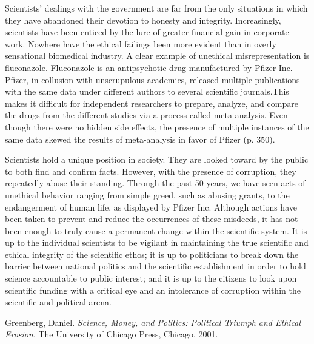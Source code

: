 \documentclass{article}[12pt]
\begin{document}
Scientists' dealings with the government are far from the only situations in
which they have abandoned their devotion to honesty and integrity.
Increasingly, scientists have been enticed by the lure of greater financial
gain in corporate work. Nowhere have the ethical failings been more evident
than in overly sensational biomedical industry. A clear example of unethical
misrepresentation is fluconazole.  Fluconazole is an antipsychotic drug
manufactured by Pfizer Inc.  Pfizer, in collusion with unscrupulous academics,
released multiple publications with the same data under different authors to
several scientific journals.This makes it difficult for independent researchers
to prepare, analyze, and compare the drugs from  the different studies via a
process called meta-analysis. Even though there were no hidden side effects,
the presence of multiple instances of the same data skewed the results of
meta-analysis in favor of Pfizer (p. 350).

Scientists hold a unique position in society. They are looked toward by the
public to both find and confirm facts. However, with the presence of
corruption, they repeatedly abuse their standing.  Through the past 50 years,
we have seen acts of unethical behavior ranging from simple greed, such as
abusing grants, to the endangerment of human life, as displayed by Pfizer Inc.
Although actions have been taken to prevent and reduce the occurrences of these
misdeeds, it has not been enough to truly cause a permanent change within the
scientific system. It is up to the individual scientists to be vigilant in
maintaining the true scientific and ethical integrity of the scientific ethos;
it is up to politicians to break down the barrier between national politics and
the scientific establishment in order to hold science accountable to public
interest; and it is up to the citizens to look upon scientific funding with a
critical eye and an intolerance of corruption within the scientific and political arena.

\newpage
\begin{thebibliography}{9}

  Greenberg, Daniel.
  \emph{Science, Money, and Politics: Political Triumph and Ethical Erosion}.
  The University of Chicago Press, Chicago,
  2001.

\end{thebibliography}
\end{document}
